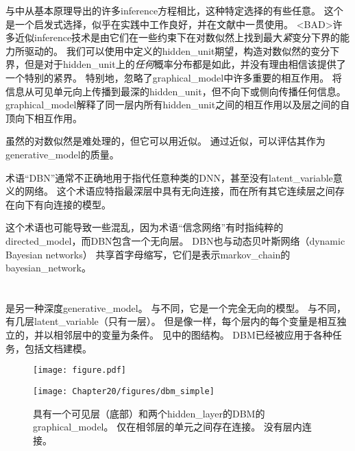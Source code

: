 与中从基本原理导出的许多\gls{inference}方程相比，这种特定选择的有些任意。
这个是一个启发式选择，似乎在实践中工作良好，并在文献中一贯使用。
<BAD>许多近似\gls{inference}技术是由它们在一些约束下在对数似然上找到最大\emph{紧}变分下界的能力所驱动的。
我们可以使用中定义的\gls{hidden_unit}期望，构造对数似然的变分下界，但是对于\gls{hidden_unit}上的\emph{任何}概率分布都是如此，并没有理由相信该提供了一个特别的紧界。
特别地，忽略了\gls{graphical_model}中许多重要的相互作用。
将信息从可见单元向上传播到最深的\gls{hidden_unit}，但不向下或侧向传播任何信息。
\gls{graphical_model}解释了同一层内所有\gls{hidden_unit}之间的相互作用以及层之间的自顶向下相互作用。


虽然的对数似然是难处理的，但它可以用近似\citep{Salakhutdinov+Murray-2008}。
通过近似，可以评估其作为\gls{generative_model}的质量。


术语``\gls{DBN}''通常不正确地用于指代任意种类的\gls{DNN}，甚至没有\gls{latent_variable}意义的网络。
这个术语应特指最深层中具有无向连接，而在所有其它连续层之间存在向下有向连接的模型。

这个术语也可能导致一些混乱，因为术语``信念网络''有时指纯粹的\gls{directed_model}，而\gls{DBN}包含一个无向层。
\gls{DBN}也与动态贝叶斯网络（dynamic Bayesian networks） \citep{Dean+Kanazawa-1989}共享首字母缩写，它们是表示\gls{markov_chain}的\gls{bayesian_network}。


\section{}
\label{sec:deep_boltzmann_machines}

 \citep{SalHinton09}是另一种深度\gls{generative_model}。
与不同，它是一个完全无向的模型。
与不同，有几层\gls{latent_variable}（只有一层）。
但是像一样，每个层内的每个变量是相互独立的，并以相邻层中的变量为条件。
见中的图结构。
\gls{DBM}已经被应用于各种任务，包括文档建模\citep{srivastava2013modeling}。

\begin{figure}[!htb]
\ifOpenSource
\centerline{\texttt{[image: figure.pdf]}}
\else
\centerline{\texttt{[image: Chapter20/figures/dbm\_simple]}}
\fi
\caption{具有一个可见层（底部）和两个\gls{hidden_layer}的\gls{DBM}的\gls{graphical_model}。
仅在相邻层的单元之间存在连接。
没有层内连接。}
\label{fig:chap20_dbm_simple}
\end{figure}


